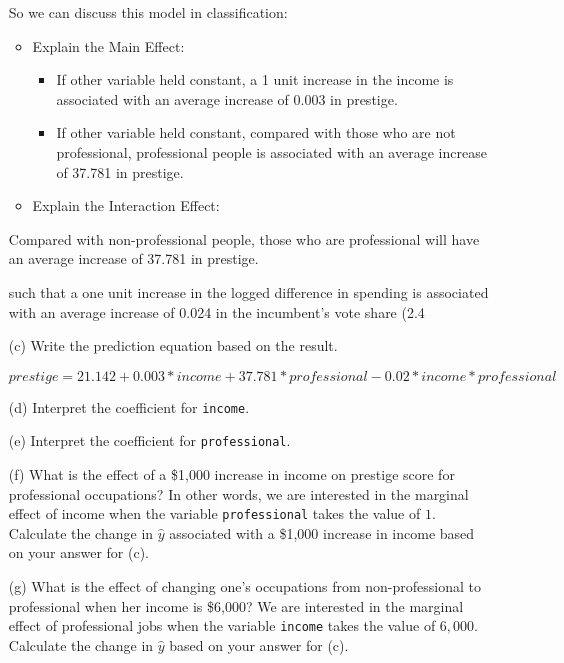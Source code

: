 \documentclass[12pt,letterpaper]{article}
\begin{document}
\begin{enumerate}
So we can discuss this model in classification:

\begin{itemize}
	\item Explain the Main Effect: 
		\begin{itemize}
			\item If other variable held constant, a 1 unit increase in the income is associated with an average increase of 0.003 in prestige.
			\item If other variable held constant, compared with those who are not professional, professional people is associated with an average increase of 37.781 in prestige. 
		\end{itemize}
	\item Explain the Interaction Effect:
	
	
\end{itemize}


Compared with non-professional people, those who are professional will have an average increase of 37.781 in prestige.



such that a one unit increase in the logged difference in spending is associated with an average increase of 0.024 in the incumbent’s vote share (2.4%

	\item [(c)]
	Write the prediction equation based on the result.
	
	$prestige = 21.142 + 0.003 * income + 37.781 * professional - 0.02 * income * professional$
	
\newpage
	\item [(d)]
	Interpret the coefficient for \texttt{income}.
	
	\vspace{10cm}	
	\item [(e)]
	Interpret the coefficient for \texttt{professional}.
	
	\newpage
	\item [(f)]
	What is the effect of a \$1,000 increase in income on prestige score for professional occupations? In other words, we are interested in the marginal effect of income when the variable \texttt{professional} takes the value of $1$. Calculate the change in $\hat{y}$ associated with a \$1,000 increase in income based on your answer for (c).
	
	\vspace{10cm}
	
	
	\item [(g)]
	What is the effect of changing one's occupations from non-professional to professional when her income is \$6,000? We are interested in the marginal effect of professional jobs when the variable \texttt{income} takes the value of $6,000$. Calculate the change in $\hat{y}$ based on your answer for (c).
	
	
\end{enumerate}
\end{document}
